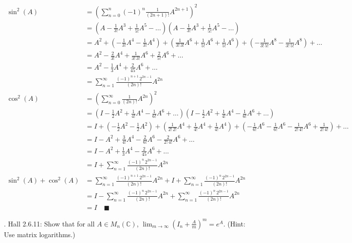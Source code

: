 \documentclass[12pt]{article}
\newcommand{\C}{\mathbb{C}}
\newcommand{\qed}{\quad \blacksquare}
\begin{document}
    \color{blue}
        \begin{align*}
            \sin^2(A) &= \left(\sum_{n=0}^n (-1)^n \frac{1}{(2n+1)!} A^{2n+1}\right)^2\\ 
                &= \left(A - \frac{1}{3!}A^3 + \frac{1}{5!}A^5 - \dots\right)\left(A - \frac{1}{3!}A^3 + \frac{1}{5!}A^5 - \dots\right)\\ 
                &= A^2 + (-\frac{1}{3!}A^4 - \frac{1}{3!}A^4) + (\frac{1}{3!\, 3!}A^6 + \frac{1}{5!}A^6 + \frac{1}{5!}A^6) + (-\frac{1}{3!\, 5!}A^8 -\frac{1}{3!\, 5!}A^8) + \dots\\
                &= A^2 -\frac{2}{3!}A^4 + \frac{1}{3!\, 3!}A^6 + \frac{2}{5!}A^6 + \dots\\ 
                &= A^2 - \frac{1}{3}A^4 + \frac{2}{45}A^6 + \dots\\ 
                &= \sum_{n=1}^{\infty} \frac{(-1)^{n+1}\, 2^{2n-1}}{(2n)!}A^{2n}\\            
            \cos^2(A) &= \left(\sum_{n=0}^{\infty} \frac{1}{(2n)!} A^{2n}\right)^2\\ 
                &= \left(I - \frac{1}{2}A^2 + \frac{1}{4!}A^4 - \frac{1}{6!}A^6 + \dots\right)\left(I - \frac{1}{2}A^2 + \frac{1}{4!}A^4 - \frac{1}{6!}A^6 + \dots\right)\\ 
                &= I + (-\frac{1}{2}A^2 - \frac{1}{2}A^2) + (\frac{1}{2!\,2!}A^4 + \frac{1}{4!}A^4 + \frac{1}{4!}A^4) + (-\frac{1}{6!}A^6 - \frac{1}{6!}A^6 - \frac{1}{2!\, 4!}A^6 + \frac{1}{2!\, 4!})  + \dots\\
                &= I - A^2 + \frac{3}{4!}A^4 - \frac{2}{6!}A^6 -\frac{2}{2!\, 4!}A^6 + \dots\\ 
                &= I - A^2 + \frac{1}{3}A^4 - \frac{2}{45}A^6 + \dots\\
                &= I + \sum_{n=1}^{\infty} \frac{(-1)^n\, 2^{2n-1}}{(2n)!}A^{2n}\\
            \sin^2(A) + \cos^2(A) &= \sum_{n=1}^{\infty} \frac{(-1)^{n+1}\, 2^{2n-1}}{(2n)!}A^{2n} + I + \sum_{n=1}^{\infty} \frac{(-1)^n\, 2^{2n-1}}{(2n)!}A^{2n}\\ 
                &= I - \sum_{n=1}^{\infty} \frac{(-1)^{n}\, 2^{2n-1}}{(2n)!}A^{2n} + \sum_{n=1}^{\infty} \frac{(-1)^n\, 2^{2n-1}}{(2n)!}A^{2n}\\
                &= I \qed
        \end{align*}
    \color{black}

. Hall 2.6.11:  Show that for all $A \in M_{n}(\C)$, $\lim_{m\to \infty} \left(I_{n} + \frac{A}{m}\right)^{m} = e^{A}$.  (Hint:  Use matrix logarithms.) 
    
\end{document}
